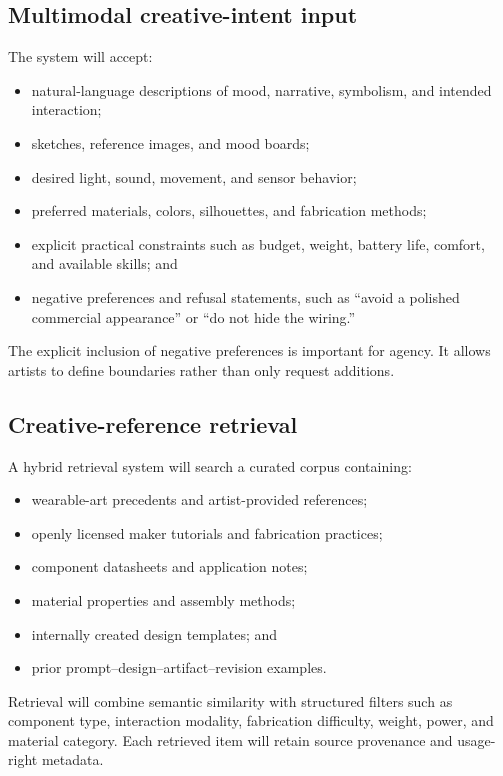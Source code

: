 \documentclass{article}
\begin{document}
\subsection{Multimodal creative-intent input}

The system will accept:

\begin{itemize}[leftmargin=*]
    \item natural-language descriptions of mood, narrative, symbolism, and
    intended interaction;
    \item sketches, reference images, and mood boards;
    \item desired light, sound, movement, and sensor behavior;
    \item preferred materials, colors, silhouettes, and fabrication methods;
    \item explicit practical constraints such as budget, weight, battery life,
    comfort, and available skills; and
    \item negative preferences and refusal statements, such as ``avoid a
    polished commercial appearance'' or ``do not hide the wiring.''
\end{itemize}

The explicit inclusion of negative preferences is important for agency. It
allows artists to define boundaries rather than only request additions.

\subsection{Creative-reference retrieval}

A hybrid retrieval system will search a curated corpus containing:

\begin{itemize}[leftmargin=*]
    \item wearable-art precedents and artist-provided references;
    \item openly licensed maker tutorials and fabrication practices;
    \item component datasheets and application notes;
    \item material properties and assembly methods;
    \item internally created design templates; and
    \item prior prompt--design--artifact--revision examples.
\end{itemize}

Retrieval will combine semantic similarity with structured filters such as
component type, interaction modality, fabrication difficulty, weight, power,
and material category. Each retrieved item will retain source provenance and
usage-right metadata.
\end{document}
